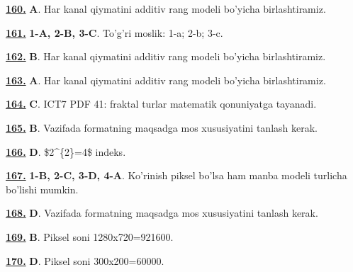 \documentclass[10pt,a4paper,oneside]{article}
\begin{document}
\par\vspace{3mm}
\noindent\hyperlink{q160}{\textbf{160.}} \textbf{A}.  Har kanal qiymatini additiv rang modeli bo'yicha birlashtiramiz.
\par\vspace{3mm}
\noindent\hyperlink{q161}{\textbf{161.}} \textbf{1-A, 2-B, 3-C}.  To'g'ri moslik: 1-a; 2-b; 3-c.
\par\vspace{3mm}
\noindent\hyperlink{q162}{\textbf{162.}} \textbf{B}.  Har kanal qiymatini additiv rang modeli bo'yicha birlashtiramiz.
\par\vspace{3mm}
\noindent\hyperlink{q163}{\textbf{163.}} \textbf{A}.  Har kanal qiymatini additiv rang modeli bo'yicha birlashtiramiz.
\par\vspace{3mm}
\noindent\hyperlink{q164}{\textbf{164.}} \textbf{C}.  ICT7 PDF 41: fraktal turlar matematik qonuniyatga tayanadi.
\par\vspace{3mm}
\noindent\hyperlink{q165}{\textbf{165.}} \textbf{B}.  Vazifada formatning maqsadga mos xususiyatini tanlash kerak.
\par\vspace{3mm}
\noindent\hyperlink{q166}{\textbf{166.}} \textbf{D}.  \$2\textasciicircum{}\{2\}=4\$ indeks.
\par\vspace{3mm}
\noindent\hyperlink{q167}{\textbf{167.}} \textbf{1-B, 2-C, 3-D, 4-A}.  Ko'rinish piksel bo'lsa ham manba modeli turlicha bo'lishi mumkin.
\par\vspace{3mm}
\noindent\hyperlink{q168}{\textbf{168.}} \textbf{D}.  Vazifada formatning maqsadga mos xususiyatini tanlash kerak.
\par\vspace{3mm}
\noindent\hyperlink{q169}{\textbf{169.}} \textbf{B}.  Piksel soni 1280x720=921600.
\par\vspace{3mm}
\noindent\hyperlink{q170}{\textbf{170.}} \textbf{D}.  Piksel soni 300x200=60000.
\par\vspace{3mm}
\end{document}
